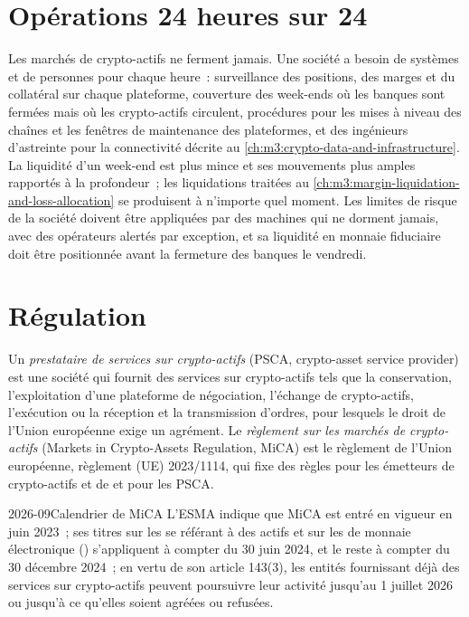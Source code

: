 \section{Opérations 24 heures sur 24}

Les marchés de crypto-actifs ne ferment jamais. Une société a besoin de systèmes et de personnes pour chaque heure~: surveillance des positions, des marges et du collatéral sur chaque plateforme, couverture des
week-ends où les banques sont fermées mais où les crypto-actifs circulent, procédures pour les mises à niveau des chaînes et les fenêtres de maintenance des plateformes, et des ingénieurs d'astreinte pour la connectivité décrite au
\cref{ch:m3:crypto-data-and-infrastructure}. La liquidité d'un week-end est plus mince et ses mouvements plus amples rapportés à la profondeur~; les liquidations
traitées au \cref{ch:m3:margin-liquidation-and-loss-allocation} se produisent à n'importe quel moment. Les limites de risque de la société doivent être appliquées par des machines qui ne dorment jamais, avec des opérateurs
alertés par exception, et sa liquidité en monnaie fiduciaire doit être positionnée avant la fermeture des banques le vendredi.

\section{Régulation}

\begin{definition}\label{def:m3:the-crypto-trading-business:mica}
Un \emph{prestataire de services sur crypto-actifs} (PSCA, crypto-asset service provider) est une société qui fournit des services sur crypto-actifs tels que la conservation, l'exploitation d'une
plateforme de négociation, l'échange de crypto-actifs, l'exécution ou la réception et la transmission d'ordres, pour lesquels le droit de l'Union européenne exige un agrément. Le \emph{règlement sur les marchés de
crypto-actifs} (Markets in Crypto-Assets Regulation, MiCA) est le règlement de l'Union européenne, règlement (UE) 2023/1114, qui fixe des règles pour
les émetteurs de crypto-actifs et de  et pour les PSCA.
\end{definition}

\begin{dated}{2026-09}{Calendrier de MiCA}\label{dat:m3:the-crypto-trading-business:mica}
L'ESMA indique que MiCA est entré en vigueur en juin 2023~; ses titres sur les  se référant à des actifs et sur les  de monnaie électronique () s'appliquent à compter du 30 juin 2024, et le
reste à compter du 30 décembre 2024~; en vertu de son article 143(3), les entités fournissant déjà des services sur crypto-actifs peuvent poursuivre leur activité jusqu'au 1 juillet 2026 ou jusqu'à ce qu'elles soient agréées ou
refusées.
\end{dated}

